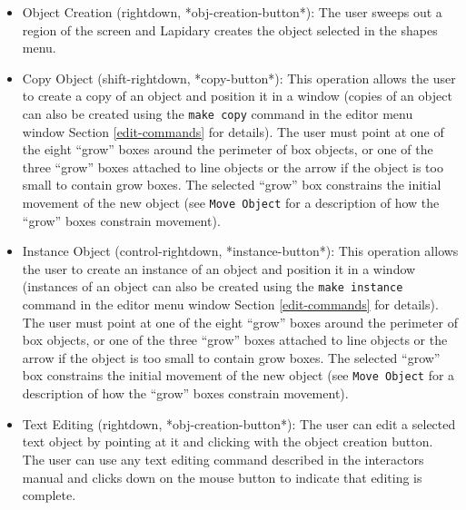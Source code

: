 \begin{itemize}
\item {}
Object Creation (rightdown, *obj-creation-button*): The user sweeps out
a region of the screen and Lapidary creates the object selected
in the shapes menu.

\item {}
Copy Object (shift-rightdown, *copy-button*):
This operation allows
the user to create a copy of an object and position it in
a window (copies of an object can also be created using the
{\tt make copy} command in the editor menu window\dashsee
Section \ref{edit-commands} for details).
The user must point at one of the eight ``grow''
boxes around the perimeter of box objects, or one of the three ``grow''
boxes attached to line objects or the arrow if the object is too
small to contain grow boxes.
The selected ``grow'' box
constrains the initial movement of the new object (see {\tt Move Object} for
a description of how the ``grow'' boxes constrain movement).

\item {}
Instance Object (control-rightdown, *instance-button*):
This operation allows
the user to create an instance of an object and position it in
a window (instances of an object can also be created using the
{\tt make instance} command in the editor menu window\dashsee
Section \ref{edit-commands} for details).
The user must point at one of the eight ``grow''
boxes around the perimeter of box objects, or one of the three ``grow''
boxes attached to line objects or the arrow if the object is too
small to contain grow boxes.
The selected ``grow'' box
constrains the initial movement of the new object (see {\tt Move Object} for
a description of how the ``grow'' boxes constrain movement).

\item {}
Text Editing (rightdown, *obj-creation-button*): The user can edit
a selected text object by pointing at it and clicking with the object
creation button.
The user can use any text editing command described in the interactors
manual and clicks down on the mouse button to indicate that editing
is complete.

\end{itemize}

